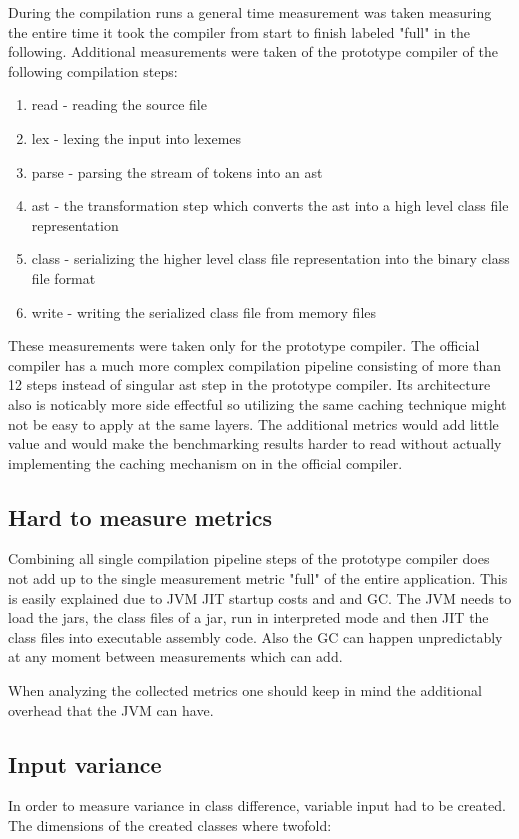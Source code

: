\documentclass{VUMIFPSbakalaurinis}
\begin{document}
During the compilation runs a general time measurement was taken measuring the entire time it took the compiler from start to finish labeled "full" in the following.
Additional measurements were taken of the prototype compiler of the following compilation steps:

\begin{enumerate}
\item{read - reading the source file}
\item{lex - lexing the input into lexemes}
\item{parse - parsing the stream of tokens into an ast}
\item{ast - the transformation step which converts the ast into a high level class file representation}
\item{class - serializing the higher level class file representation into the binary class file format}
\item{write - writing the serialized class file from memory files}
\end{enumerate}

These measurements were taken only for the prototype compiler.
The official compiler has a much more complex compilation pipeline consisting of more than 12 steps instead of singular ast step in the prototype compiler.
Its architecture also is noticably more side effectful so utilizing the same caching technique might not be easy to apply at the same layers.
The additional metrics would add little value and would make the benchmarking results harder to read without actually implementing the caching mechanism on in the official compiler.

\subsection{Hard to measure metrics}
Combining all single compilation pipeline steps of the prototype compiler does not add up to the single measurement metric "full" of the entire application.
This is easily explained due to JVM JIT startup costs and and GC.
The JVM needs to load the jars, the class files of a jar, run in interpreted mode and then JIT the class files into executable assembly code.
Also the GC can happen unpredictably at any moment between measurements which can add.

When analyzing the collected metrics one should keep in mind the additional overhead that the JVM can have.

\subsection{Input variance}
In order to measure variance in class difference, variable input had to be created.
The dimensions of the created classes where twofold:
\end{document}
